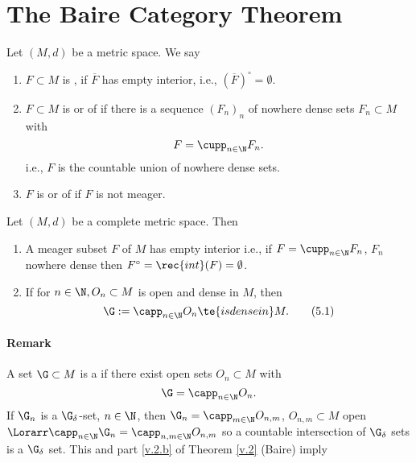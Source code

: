 \section{The Baire Category Theorem}

\begin{definition}\label{v.1}
	Let $(M,d)$ be a metric space. We say
	\begin{enumerate}[label=\alph*)]
		\item $F\subset M$ is , if $\overline{F}$ has empty interior, i.e.,\label{v.1.a} $(\overline{F})^\circ=\emptyset$.
		
		\item $F\subset M$ is  \rec{(}or of \rec{)} if there is a sequence $(F_n)_n$ of\label{v.1.b} nowhere dense sets $F_n\subset M$ with
		\[F=\cupp_{n\in\N} F_n.\]
		\rec{(}i.e., $F$ is the countable union of nowhere dense sets\rec{)}.
		
		\item $F$ is  \rec{(}or of \rec{)} if $F$ is not meager.
	\end{enumerate}
\end{definition}

\begin{thm}[Baire]\label{v.2}
	Let $(M,d)$ be a complete metric space. Then
	\begin{enumerate}[label=\alph*)]
		\item A meager subset $F$ of $M$ has empty interior \label{v.2.a}\rec{(}i.e., if $F=\cupp_{n\in\N}F_n$, $F_n$ nowhere dense then $F^\circ=\rec{int}(F)=\emptyset$\rec{)}.
		\item \label{v.2.b} If for $n\in\N,O_n\subset M$ is open and dense in $M$, then
		\[\G:=\capp_{n\in\N}O_n\te{ is dense in }M.\tag{5.1}\label{5.1}\]
	\end{enumerate}
\end{thm}

\paragraph{Remark}
A set $\G\subset M$ is a  if there exist open sets $O_n\subset M$ with \[\G=\capp_{n\in\N}O_n.\]
If $\G_n$ is a $\G_\delta$-set, $n\in\N$, then $\G_n=\capp_{m\in\N}O_{n,m}$, $O_{n,m}\subset M$ open $\Lorarr\capp_{n\in\N}\G_n=\capp_{n,m\in\N}O_{n,m}$ so a countable intersection of $\G_\delta$ sets is a $\G_\delta$ set. This and part \ref{v.2.b} of Theorem \ref{v.2} (Baire) imply


